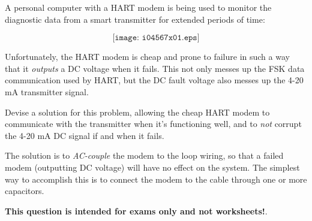 

A personal computer with a HART modem is being used to monitor the diagnostic data from a smart transmitter for extended periods of time:

$$\texttt{[image: i04567x01.eps]}$$

Unfortunately, the HART modem is cheap and prone to failure in such a way that it {\it outputs} a DC voltage when it fails.  This not only messes up the FSK data communication used by HART, but the DC fault voltage also messes up the 4-20 mA transmitter signal.

\vskip 10pt

Devise a solution for this problem, allowing the cheap HART modem to communicate with the transmitter when it's functioning well, and to {\it not} corrupt the 4-20 mA DC signal if and when it fails.







The solution is to {\it AC-couple} the modem to the loop wiring, so that a failed modem (outputting DC voltage) will have no effect on the system.  The simplest way to accomplish this is to connect the modem to the cable through one or more capacitors.







{\bf This question is intended for exams only and not worksheets!}.


